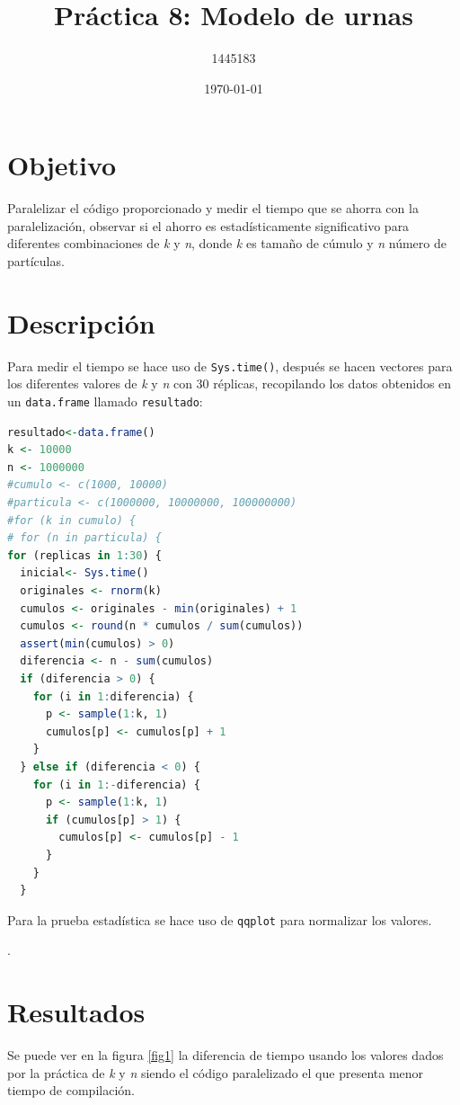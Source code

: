 \documentclass{article}
\author{1445183}
\title{Práctica 8: Modelo de urnas}
\date{\today}
\begin{document}
\maketitle

\section{Objetivo}
Paralelizar el código proporcionado \cite{elisaweb8} y medir el tiempo que se ahorra con la paralelización, observar si el ahorro es estadísticamente significativo para diferentes combinaciones de \textit{k} y \textit{n}, donde \textit{k} es tamaño de cúmulo y \textit{n} número de partículas.

\section{Descripción}
Para medir el tiempo se hace uso de \texttt{Sys.time()}, después se hacen vectores para los diferentes valores de  \textit{k} y \textit{n} con 30 réplicas, recopilando los datos obtenidos en un \texttt{data.frame} llamado \texttt{resultado}:
\begin{lstlisting}[language=R]
resultado<-data.frame()
k <- 10000
n <- 1000000
#cumulo <- c(1000, 10000)
#particula <- c(1000000, 10000000, 100000000)
#for (k in cumulo) {
# for (n in particula) {
for (replicas in 1:30) {
  inicial<- Sys.time()
  originales <- rnorm(k)
  cumulos <- originales - min(originales) + 1
  cumulos <- round(n * cumulos / sum(cumulos))
  assert(min(cumulos) > 0)
  diferencia <- n - sum(cumulos)
  if (diferencia > 0) {
    for (i in 1:diferencia) {
      p <- sample(1:k, 1)
      cumulos[p] <- cumulos[p] + 1
    }
  } else if (diferencia < 0) {
    for (i in 1:-diferencia) {
      p <- sample(1:k, 1)
      if (cumulos[p] > 1) {
        cumulos[p] <- cumulos[p] - 1
      }
    }
  }
\end{lstlisting}

Para la prueba estadística se hace uso de \texttt{qqplot} para normalizar los valores.

.
\newpage


\section{Resultados}
Se puede ver en la figura \ref{fig1} la diferencia de tiempo usando los valores dados por la práctica de \textit{k} y \textit{n} siendo el código paralelizado el que presenta menor tiempo de compilación.
\end{document}

